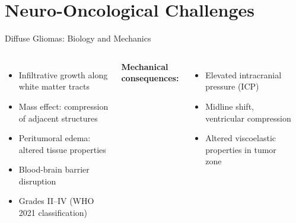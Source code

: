 
\section{Neuro-Oncological Challenges}

\begin{frame}{Diffuse Gliomas: Biology and Mechanics}

  \begin{columns}[T]
    \begin{itemize}
      \item Infiltrative growth along white matter tracts
      \item Mass effect: compression of adjacent structures
      \item Peritumoral edema: altered tissue properties
      \item Blood-brain barrier disruption
      \item Grades II--IV (WHO 2021 classification)
    \end{itemize}

    \bigskip

    \textbf{Mechanical consequences:}
    \begin{itemize}
      \item Elevated intracranial pressure (ICP)
      \item Midline shift, ventricular compression
      \item Altered viscoelastic properties in tumor zone
    \end{itemize}

    \begin{center}
    \end{center}
  \end{columns}

\end{frame}

